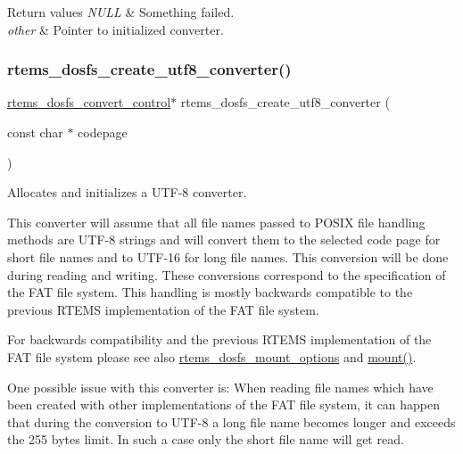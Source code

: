 \begin{DoxyRetVals}{Return values}
{\em N\+U\+LL} & Something failed. \\
\hline
{\em other} & Pointer to initialized converter. \\
\hline
\end{DoxyRetVals}
\mbox{\label{group__DOSFS_ga47cec61b81f7868a5b821709246a8509}} 
\subsubsection{\texorpdfstring{rtems\_dosfs\_create\_utf8\_converter()}{rtems\_dosfs\_create\_utf8\_converter()}}
{\footnotesize\ttfamily \mbox{\hyperlink{structrtems__dosfs__convert__control}{rtems\+\_\+dosfs\+\_\+convert\+\_\+control}}$\ast$ rtems\+\_\+dosfs\+\_\+create\+\_\+utf8\+\_\+converter (\begin{DoxyParamCaption}\item[{const char $\ast$}]{codepage }\end{DoxyParamCaption})}



Allocates and initializes a U\+T\+F-\/8 converter. 

This converter will assume that all file names passed to P\+O\+S\+IX file handling methods are U\+T\+F-\/8 strings and will convert them to the selected code page for short file names and to U\+T\+F-\/16 for long file names. This conversion will be done during reading and writing. These conversions correspond to the specification of the F\+AT file system. This handling is mostly backwards compatible to the previous R\+T\+E\+MS implementation of the F\+AT file system.

For backwards compatibility and the previous R\+T\+E\+MS implementation of the F\+AT file system please see also \mbox{\hyperlink{structrtems__dosfs__mount__options}{rtems\+\_\+dosfs\+\_\+mount\+\_\+options}} and \mbox{\hyperlink{group__FileSystemTypesAndMount_gaf3c1bed49bb0f3dec88d330b4f88d48b}{mount()}}.

One possible issue with this converter is\+: When reading file names which have been created with other implementations of the F\+AT file system, it can happen that during the conversion to U\+T\+F-\/8 a long file name becomes longer and exceeds the 255 bytes limit. In such a case only the short file name will get read.


